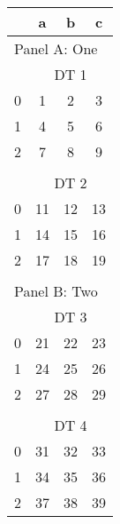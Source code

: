 \begin{table}
\centering
\begin{threeparttable}
\caption{}
\begin{tabular}{lccc}
\toprule
  & a & b & c\\
\midrule
\multicolumn{4}{l}{Panel A: One}\\
  & \multicolumn{3}{c}{DT 1}\\
\cmidrule(lr){2-4}
0 & 1 & 2 & 3 \\
1 & 4 & 5 & 6 \\
2 & 7 & 8 & 9 \\
  &   &   &  \\
  & \multicolumn{3}{c}{DT 2}\\
\cmidrule(lr){2-4}
0 & 11 & 12 & 13 \\
1 & 14 & 15 & 16 \\
2 & 17 & 18 & 19 \\
  &   &   &  \\
\multicolumn{4}{l}{Panel B: Two}\\
  & \multicolumn{3}{c}{DT 3}\\
\cmidrule(lr){2-4}
0 & 21 & 22 & 23 \\
1 & 24 & 25 & 26 \\
2 & 27 & 28 & 29 \\
  &   &   &  \\
  & \multicolumn{3}{c}{DT 4}\\
\cmidrule(lr){2-4}
0 & 31 & 32 & 33 \\
1 & 34 & 35 & 36 \\
2 & 37 & 38 & 39 \\
\bottomrule

\end{tabular}
\end{threeparttable}
\end{table}